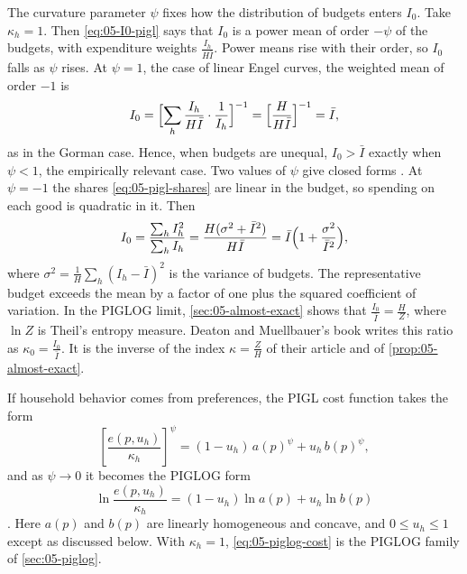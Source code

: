 The curvature parameter $\psi$ fixes how the distribution of budgets enters $I_0$. Take $\kappa_h = 1$.
Then \eqref{eq:05-I0-pigl} says that $I_0$ is a power mean of order $-\psi$ of the budgets, with
expenditure weights $\frac{I_h}{H\bar I}$. Power means rise with their order, so $I_0$ falls as $\psi$
rises. At $\psi = 1$, the case of linear Engel curves, the weighted mean of order $-1$ is
\begin{equation*}
  I_0 = \Bigl[\sum_h \frac{I_h}{H\bar I}\cdot\frac{1}{I_h}\Bigr]^{-1} = \Bigl[\frac{H}{H\bar I}\Bigr]^{-1}
      = \bar I ,
\end{equation*}
as in the Gorman case. Hence, when budgets are unequal, $I_0 > \bar I$ exactly when $\psi < 1$, the
empirically relevant case. Two
values of $\psi$ give closed forms \citep[\S 6.2, eqs.~2.14--2.15, p.~157]{DeatonMuellbauer1980b}. At
$\psi = -1$ the shares \eqref{eq:05-pigl-shares} are linear in the budget, so spending on each good is
quadratic in it. Then
\begin{equation*}
  I_0 = \frac{\sum_h I_h^2}{\sum_h I_h} = \frac{H(\sigma^2 + \bar I^2)}{H\bar I}
      = \bar I\Bigl(1 + \frac{\sigma^2}{\bar I^2}\Bigr),
\end{equation*}
where $\sigma^2 = \frac{1}{H}\sum_h (I_h - \bar I)^2$ is the variance of budgets. The representative budget
exceeds the mean by a factor of one plus the squared coefficient of variation. In the PIGLOG limit,
\cref{sec:05-almost-exact} shows that $\frac{I_0}{\bar I} = \frac{H}{Z}$, where $\ln Z$ is Theil's entropy
measure.
Deaton and Muellbauer's book writes this ratio as $\kappa_0 = \frac{I_0}{\bar I}$. It is the inverse of the
index $\kappa = \frac{Z}{H}$ of their article and of \cref{prop:05-almost-exact}.

If household behavior comes from preferences, the PIGL cost function takes the form
\begin{equation}\label{eq:05-pigl-cost}
  \left[\frac{e(p, u_h)}{\kappa_h}\right]^{\psi} = (1 - u_h)\, a(p)^{\psi} + u_h\, b(p)^{\psi},
\end{equation}
and as $\psi \to 0$ it becomes the PIGLOG form
\begin{equation}\label{eq:05-piglog-cost}
  \ln\frac{e(p, u_h)}{\kappa_h} = (1 - u_h) \ln a(p) + u_h \ln b(p)
\end{equation}
\citep[eqs.~A6--A7]{DeatonMuellbauer1980a}. Here $a(p)$ and $b(p)$ are linearly homogeneous and concave,
and $0 \le u_h \le 1$ except as discussed below. With $\kappa_h = 1$, \eqref{eq:05-piglog-cost} is the
PIGLOG family of \cref{sec:05-piglog}.

